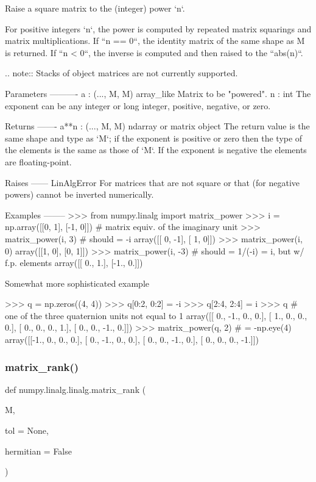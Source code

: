 \begin{DoxyVerb}Raise a square matrix to the (integer) power `n`.

For positive integers `n`, the power is computed by repeated matrix
squarings and matrix multiplications. If ``n == 0``, the identity matrix
of the same shape as M is returned. If ``n < 0``, the inverse
is computed and then raised to the ``abs(n)``.

.. note:: Stacks of object matrices are not currently supported.

Parameters
----------
a : (..., M, M) array_like
    Matrix to be "powered".
n : int
    The exponent can be any integer or long integer, positive,
    negative, or zero.

Returns
-------
a**n : (..., M, M) ndarray or matrix object
    The return value is the same shape and type as `M`;
    if the exponent is positive or zero then the type of the
    elements is the same as those of `M`. If the exponent is
    negative the elements are floating-point.

Raises
------
LinAlgError
    For matrices that are not square or that (for negative powers) cannot
    be inverted numerically.

Examples
--------
>>> from numpy.linalg import matrix_power
>>> i = np.array([[0, 1], [-1, 0]]) # matrix equiv. of the imaginary unit
>>> matrix_power(i, 3) # should = -i
array([[ 0, -1],
       [ 1,  0]])
>>> matrix_power(i, 0)
array([[1, 0],
       [0, 1]])
>>> matrix_power(i, -3) # should = 1/(-i) = i, but w/ f.p. elements
array([[ 0.,  1.],
       [-1.,  0.]])

Somewhat more sophisticated example

>>> q = np.zeros((4, 4))
>>> q[0:2, 0:2] = -i
>>> q[2:4, 2:4] = i
>>> q # one of the three quaternion units not equal to 1
array([[ 0., -1.,  0.,  0.],
       [ 1.,  0.,  0.,  0.],
       [ 0.,  0.,  0.,  1.],
       [ 0.,  0., -1.,  0.]])
>>> matrix_power(q, 2) # = -np.eye(4)
array([[-1.,  0.,  0.,  0.],
       [ 0., -1.,  0.,  0.],
       [ 0.,  0., -1.,  0.],
       [ 0.,  0.,  0., -1.]])\end{DoxyVerb}
 \mbox{\label{namespacenumpy_1_1linalg_1_1linalg_a2f2819f232cf12cf939156d12243225e}} 
\subsubsection{\texorpdfstring{matrix\+\_\+rank()}{matrix\_rank()}}
{\footnotesize\ttfamily def numpy.\+linalg.\+linalg.\+matrix\+\_\+rank (\begin{DoxyParamCaption}\item[{}]{M,  }\item[{}]{tol = {\ttfamily None},  }\item[{}]{hermitian = {\ttfamily False} }\end{DoxyParamCaption})}

